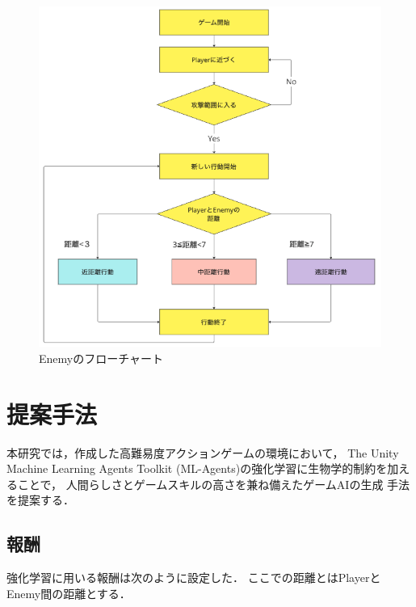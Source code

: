 \documentclass[a4paper,12pt,oneside,openany,titlepage]{jreport}
\begin{document}
 \begin{figure}[h]
   \begin{center}
     \includegraphics[width=13cm]{enemy_huro.png}
     \caption{Enemyのフローチャート}
     \label{enemy_huro}
   \end{center}
 \end{figure}


\chapter{提案手法}
 \thispagestyle{fancy}
 \lhead{\leftmark}
 \rhead{\thepage}
 \renewcommand{\headrulewidth}{1pt}

 本研究では，作成した高難易度アクションゲームの環境において，
 The Unity Machine Learning Agents Toolkit
 (ML-Agents)の強化学習に生物学的制約を加えることで，
 人間らしさとゲームスキルの高さを兼ね備えたゲームAIの生成
 手法を提案する．
 
 \section{報酬}
 強化学習に用いる報酬は次のように設定した．
 ここでの距離とはPlayerとEnemy間の距離とする．
 
\end{document}
